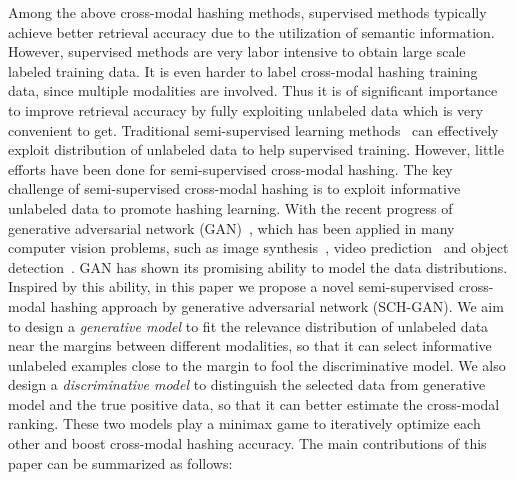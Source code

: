 \documentclass[journal]{IEEEtran}
\begin{document}
Among the above cross-modal hashing methods, supervised methods typically achieve better retrieval accuracy due to the utilization of semantic information. However, supervised methods are very labor intensive to obtain large scale labeled training data. It is even harder to label cross-modal hashing training data, since multiple modalities are involved. Thus it is of significant importance to improve retrieval accuracy by fully exploiting unlabeled data which is very convenient to get. Traditional semi-supervised learning methods~\cite{semi} can effectively exploit distribution of unlabeled data to help supervised training. However, little efforts have been done for semi-supervised cross-modal hashing. The key challenge of semi-supervised cross-modal hashing is to exploit informative unlabeled data to promote hashing learning. With the recent progress of generative adversarial network (GAN)~\cite{gan,infogan,videogan,obgan}, which has been applied in many computer vision problems, such as image synthesis~\cite{infogan}, video prediction~\cite{videogan} and object detection~\cite{obgan}. GAN has shown its promising ability to model the data distributions. Inspired by this ability, in this paper we propose a novel semi-supervised cross-modal hashing approach by generative adversarial network (SCH-GAN). We aim to design a \textit{generative model} to fit the relevance distribution of unlabeled data near the margins between different modalities, so that it can select informative unlabeled examples close to the margin to fool the discriminative model. We also design a \textit{discriminative model} to distinguish the selected data from generative model and the true positive data, so that it can better estimate the cross-modal ranking. These two models play a minimax game to iteratively optimize each other and boost cross-modal hashing accuracy. The main contributions of this paper can be summarized as follows:
\end{document}
